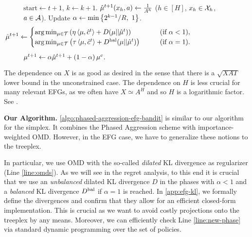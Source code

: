 \documentclass[11pt]{article}
\begin{document}
\begin{figure*}[ht]
\begin{minipage}{1.0\textwidth}
\begin{algorithm}[H]
\begin{algorithmic}[1]
                \State $\text{start} \gets t+1$, $k\gets k+1$. 
                \State $\hat{\mu}^{t+1}(x_h, a) \gets \frac{1}{A^h}$ ($h \in[H]$, $x_h\in \mathcal{X}_h$, $a\in \mathcal{A}$).  
                \label{line:reset-omd}
                \State Update $\alpha \gets \min\left\{ 2^{k-1}/R,~ 1 \right\}$.  \label{line:new-phase2}
        \Else {}
            \State \label{line:omds}
            \begin{align}
                \hspace{-2.9cm}\muHat^{t+1} \gets \begin{cases}
                \arg\min_{\mu \in \Tcal} \round{\eta \inner{\mu}{\cHat^t} + D(\mu || \muHat^t)} \quad\quad &\text{(if $\alpha<1$)},\\
                \arg\min_{\mu \in \Tcal} \round{\tau \inner{\mu}{\cHat^t} + \Dbal(\mu || \muHat^t)} \quad\quad &\text{(if $\alpha=1$)}.
                \end{cases}\label{line:omd}
            \end{align}
        \EndIf
            \State $\mu^{t+1} \gets \alpha  \hat{\mu}^{t+1} + \left( 1 - \alpha \right) \mu^c$.  \label{line:combine-bandit}
        \EndFor
    \end{algorithmic}
\end{algorithm}
\end{minipage}
\end{figure*}

\begin{remark}The dependence on $X$ is as good as desired in the sense that there is a $\sqrt{XAT}$ lower bound in the unconstrained case. The dependence on $H$ is less crucial for many relevant EFGs, as we often have $X\simeq A^H$ and so $H$ is a logarithmic factor. See \citet{bai2022near}.
\end{remark}

\textbf{Our Algorithm.} \cref{algo:phased-aggression-efg-bandit} is similar to our algorithm for the simplex. It combines the Phased Aggression scheme with importance-weighted OMD. However, in the EFG case, we have to generalize these notions to the treeplex. 

In particular, we use OMD with the so-called \emph{dilated} KL divergence as regularizer (Line \ref{line:omds}). As we will see in the regret analysis, to this end it is crucial that we use an \emph{unbalanced} dilated KL divergence $D$ \citep{kozuno2021model} in the phases with $\alpha<1$ and a \emph{balanced} KL divergence $D^{\text{bal}}$ \citep{bai2022near} if $\alpha=1$ is reached. In \cref{app:efg-kl}, we formally define the divergences and confirm that they allow for an efficient closed-form implementation. This is crucial as we want to avoid costly projections onto the treeplex by any means. Moreover, we can efficiently check Line \ref{line:new-phase} via standard dynamic programming over the set of policies.
\end{document}
